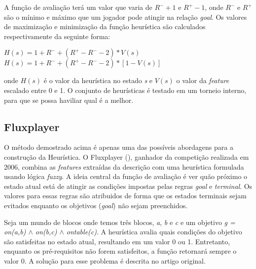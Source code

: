 A função de avaliação terá um valor que varia de $R^- + 1$ e $R^+ - 1$, onde $R^-$ e $R^+$ são o mínimo e máximo que um jogador pode atingir na relação {\it goal}. Os valores de maximização e minimização da função heurística são calculados respectivamente da seguinte forma:
\begin{center}
 $H(s) = 1 + R^- + (R^+ - R^- - 2) * V(s) $
 $H(s) = 1 + R^- + (R^+ - R^- - 2) * [1 - V(s)] $
\end{center}
onde $H(s)$ é o valor da heurística no estado {\it s} e $V(s)$ o valor da {\it feature} escalado entre 0 e 1.
O conjunto de heurísticas é testado em um torneio interno, para que se possa haviliar qual é a melhor.

\subsection{Fluxplayer}
O método demostrado acima é apenas uma das possíveis abordagens para a construção da Heurística. O Fluxplayer (\cite{flux}), ganhador da competição realizada em 2006, combina as {\it features} extraídas da descrição com uma heurística formulada usando lógica {\it fuzzy}. A ideia central da função de avaliação é ver quão próximo o estado atual está de atingir as condições impostas pelas regras {\it goal} e {\it terminal}. Os valores para essas regras são atribuidos de forma que os estados terminais sejam evitados enquanto os objetivos ({\it goal}) não sejam preenchidos.

Seja um mundo de blocos onde temos três blocos, {\it a}, {\it b} e {\it c} e um objetivo {\it g = on(a,b) $\land$ on(b,c) $\land$ ontable(c)}. A heurística avalia quais condições do objetivo são satisfeitas no estado atual, resultando em um valor 0 ou 1. Entretanto, enquanto os pré-requisitos não forem satisfeitos, a função retornará sempre o valor 0. A solução para esse problema é descrita no artigo original.
